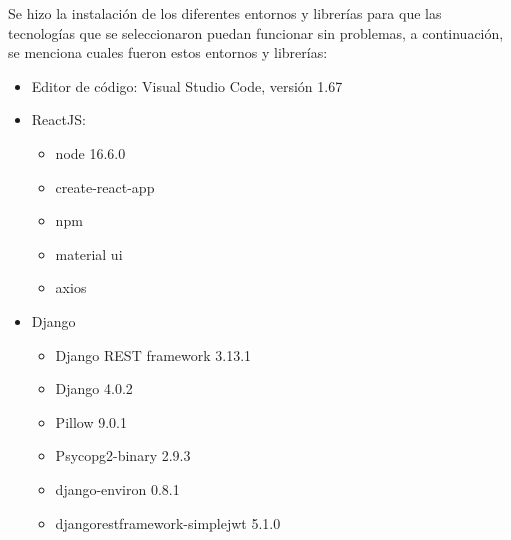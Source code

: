     Se hizo la instalación de los diferentes entornos y librerías para que las tecnologías que se seleccionaron puedan funcionar sin problemas, a continuación, se menciona cuales fueron estos entornos y librerías:
\begin{itemize}
    \item Editor de código:  Visual Studio Code, versión 1.67
\item ReactJS:
\begin{itemize}
    \item node 16.6.0
    \item create-react-app
    \item npm
    \item material ui
    \item axios
\end{itemize}
\item Django
\begin{itemize}
    \item Django REST framework 3.13.1
    \item Django 4.0.2
    \item Pillow 9.0.1
    \item Psycopg2-binary 2.9.3
    \item django-environ 0.8.1
    \item djangorestframework-simplejwt 5.1.0
\end{itemize}
\end{itemize}
